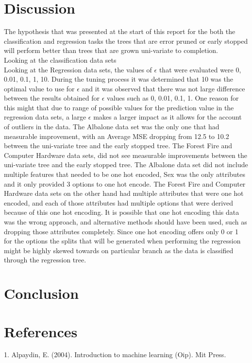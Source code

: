 \documentclass[twoside,11pt]{article}
\begin{document}
\section{Discussion}
\hspace*{10mm} The hypothesis that was presented at the start of this report for the both the classification and regression tasks the trees that are error pruned or early stopped will perform better than trees that are grown uni-variate to completion.\\
\hspace*{10mm} Looking at the classification data sets\\
\hspace*{10mm} Looking at the Regression data sets, the values of $\epsilon$ that were evaluated were 0, 0.01, 0.1, 1, 10. During the tuning process it was determined that 10 was the optimal value to use for $\epsilon$ and it was observed that there was not large difference between the results obtained for $\epsilon$ values such as 0, 0.01, 0.1, 1. One reason for this might that due to range of possible values for the prediction value in the regression data sets, a large $\epsilon$ makes a larger impact as it allows for the account of outliers in the data. The Albalone data set was the only one that had measurable improvement, with an Average MSE dropping from 12.5 to 10.2 between the uni-variate tree and the early stopped tree. The Forest Fire and Computer Hardware data sets, did not see measurable improvements between the uni-variate tree and the early stopped tree. The Albalone data set did not include multiple features that needed to be one hot encoded, Sex was the only attributes and it only provided 3 options to one hot encode. The Forest Fire and Computer Hardware data sets on the other hand had multiple attributes that were one hot encoded, and each of those attributes had multiple options that were derived because of this one hot encoding. It is possible that one hot encoding this data was the wrong approach, and alternative methods should have been used, such as dropping those attributes completely. Since one hot encoding offers only 0 or 1 for the options the splits that will be generated when performing the regression might be highly skewed towards on particular branch as the data is classified through the regression tree.\\
\section{Conclusion}
\hspace*{10mm} 

\section{References}
1. Alpaydin, E. (2004). Introduction to machine learning (Oip). Mit Press. 

\newpage
\end{document}
